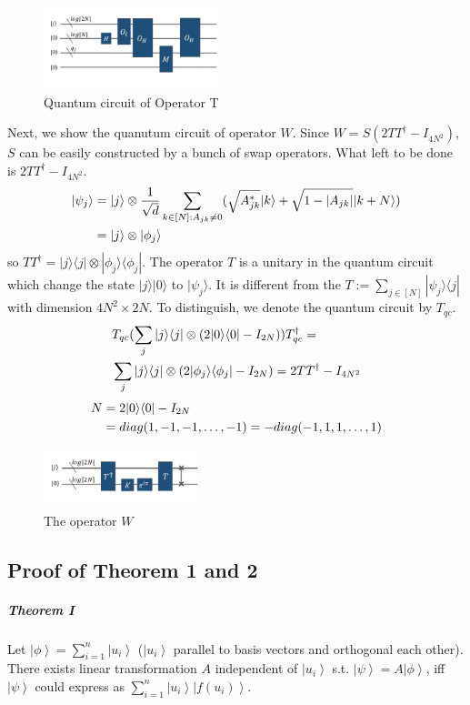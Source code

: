 \documentclass[%
 reprint,
 amsmath,amssymb,
pra,
]{revtex4-1}
\begin{document}
\begin{figure}[h]
\centering
\includegraphics[width=0.45\textwidth]{Fig/T}
\caption{Quantum circuit of Operator T}
\label{T}
\end{figure}

Next, we show the quanutum circuit of operator $W$. Since $W=S(2TT^\dagger-I_{4N^2})$, $S$ can be easily constructed by a bunch of swap operators.
What left to be done is $2TT^\dagger-I_{4N^2}$. 
\begin{align}
|\psi_j\rangle&=|j\rangle\otimes\frac{1}{\sqrt{d}} 
\sum_{k\in [N]:A_{jk}\neq 0}(\sqrt{A^*_{jk}}|k\rangle+\sqrt{1-|A_{jk}|}|k+N
\rangle)\notag\\
&=|j\rangle\otimes|\phi_j\rangle\notag
\end{align}
so $TT^\dagger=|j\rangle\langle j|\otimes|\phi_j\rangle\langle\phi_j|$.
The operator $T$ is a unitary in the quantum circuit which change
the state $|j\rangle|0\rangle$ to $|\psi_j\rangle$. It is different from the
$T:=\sum_{j\in[N]}|\psi_j\rangle\langle j|$ with dimension $4N^2\times2N$.
To distinguish, we denote the quantum circuit by $T_{qc}$.
\begin{align}
&T_{qc}(\sum_j|j\rangle\langle j|\otimes(2|0\rangle\langle0|-I_{2N}))
T_{qc}^\dagger=\notag\\
&\sum_j|j\rangle\langle j|\otimes
(2|\phi_j\rangle\langle \phi_j|-I_{2N})=2TT^\dagger-I_{4N^2}\notag
\end{align}
\begin{align}
N&=2|0\rangle\langle0|-I_{2N}\notag \\
&=diag(1,-1,-1,\dots,-1)=-diag(-1,1,1,\dots,1)\notag
\end{align}
\begin{figure}[htbp]
\centering
\includegraphics[width=0.4\textwidth]{Fig/WW}
\caption{The operator $W$}
\label{W}
\end{figure}

\subsection{Proof of Theorem 1 and 2}\label{ProofOfTheorem}
\subparagraph{Theorem I} Let $\left|\phi\right\rangle = \sum_{i=1}^n \left|u_i\right\rangle$ ($\left|u_i\right\rangle$ parallel to basis vectors and orthogonal each other). There exists 
linear transformation $A$ independent of $\left|u_{i}\right\rangle$ s.t. $\left|\psi\right\rangle = A\left|\phi\right\rangle$, iff $\left|\psi\right\rangle$ could express as $\sum_{i=1}^{n}\left|u_i\right\rangle\left|f\left(u_i\right)\right\rangle$.
\end{document}
